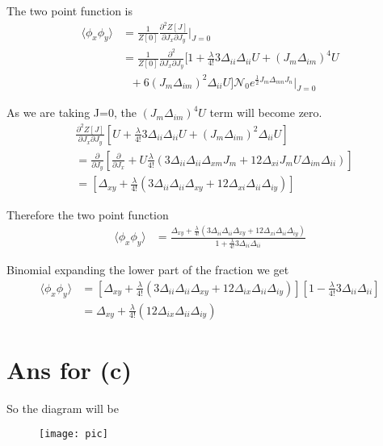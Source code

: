 \documentclass[12pt, letterpaper]{article}
\newcommand*{\1}{\hspace{1pt}}
\begin{document}
    The two point function is
    \begin{align*}
        \langle \phi_{x}\phi_{y} \rangle & = \frac{1}{Z[0]}\frac{\partial ^2 Z[J]}{\partial J_{x} \partial J_{y}}\Biggr|_{J=0} \\
        & =  \frac{1}{Z[0]}\frac{\partial ^2 }{\partial J_{x} \partial J_{y}}  [1+\frac{\lambda}{4!}3\Delta_{ii}\Delta_{ii}U + (J_{m}\Delta_{im})^{4} U \\
        & \ \ \  + 6(J_{m}\Delta_{im})^{2}\Delta_{ii} U]\mathcal{N}_{0} e^{\frac{1}{2} J_{m} \Delta _{mn} J_{n}}\Biggr|_{J=0}
    \end{align*}

    As we are taking J=0, the  $(J_{m}\Delta_{im})^{4} U$ term will become zero.
    \begin{align*}
         &\frac{\partial ^2 Z[J]}{\partial J_{x} \partial J_{y}}  [U+\frac{\lambda}{4!}3\Delta_{ii}\Delta_{ii}U + (J_{m}\Delta_{im})^{2}\Delta_{ii} U] \\
         & = \frac{\partial }{\partial J_{y}}[\frac{\partial}{\partial J_{x}} + U \frac{\lambda}{4!}(3\Delta_{ii}\Delta_{ii}\Delta_{xm}J_{m} + 12\Delta_{xi}J_{m}U\Delta_{im}\Delta_{ii})] \\ 
         & = [\Delta_{xy} + \frac{\lambda}{4!}(3\Delta_{ii}\Delta_{ii}\Delta_{xy} + 12\Delta_{xi}\Delta_{ii}\Delta_{iy})]
    \end{align*}

    Therefore the two point function
    \begin{align}
        \langle \phi_{x}\phi_{y} \rangle & = \frac{\Delta_{xy} + \frac{\lambda}{4!}(3\Delta_{ii}\Delta_{ii}\Delta_{xy} + 12\Delta_{xi}\Delta_{ii}\Delta_{iy})}{1+\frac{\lambda}{4!} 3\Delta_{ii}\Delta_{ii}}
    \end{align}

    Binomial expanding the lower part of the fraction we get
     \begin{align}
        \langle \phi_{x}\phi_{y} \rangle & = [\Delta_{xy} + \frac{\lambda}{4!}( 3\Delta_{ii}\Delta_{ii}\Delta_{xy} + 12\Delta_{ix}\Delta_{ii}\Delta_{iy})][1-\frac{\lambda}{4!} 3\Delta_{ii}\Delta_{ii}] \\
        & = \Delta_{xy} + \frac{\lambda}{4!}(12\Delta_{ix}\Delta_{ii}\Delta_{iy})
    \end{align}

    \section*{Ans for (c)}

    So the diagram will be 
    \begin{figure}[h]
    \centering
    \texttt{[image: pic]}
    \end{figure}
\end{document}
